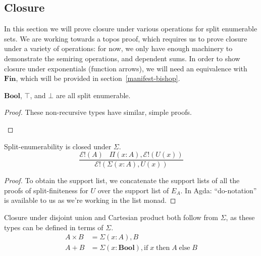 \subsection{Closure}
In this section we will prove closure under various operations for split
enumerable sets.
We are working towards a topos proof, which requires us to prove closure under
a variety of operations: for now, we only have enough machinery to demonstrate
the semiring operations, and dependent sums.
In order to show closure under exponentials (function arrows), we will need an
equivalence with \(\mathbf{Fin}\), which will be provided in
section~\ref{manifest-bishop}.
\begin{rm-lemma} \label{split-enum-bool-top-bot}
  \(\mathbf{Bool}\), \(\top\), and \(\bot\) are all split enumerable.
\end{rm-lemma}
\begin{proof}
  These non-recursive types have similar, simple proofs.
  \begin{multicols}{3}
  \end{multicols}
\end{proof}
\begin{rm-theorem} \label{split-enum-sigma}
  Split-enumerability is closed under \(\Sigma\).
  \begin{equation} \label{split-enum-sigma-clos-sig}
    \frac{
      \mathcal{E}!(A) \; \; \; \Pi (x : A) , \mathcal{E}!(U(x))
    }{
      \mathcal{E}!(\Sigma (x : A) , U(x))
    }
  \end{equation}
\end{rm-theorem}
\begin{proof}
  To obtain the support list, we concatenate the support lists of all the proofs
  of split-finiteness for \(U\) over the support list of \(E_A\).
  In Agda:
  ``do-notation'' is available to us as we're working in the list monad.
\end{proof}
Closure under disjoint union and Cartesian product both follow from \(\Sigma\),
as these types can be defined in terms of \(\Sigma\).
\begin{align}
  A \times B &= \Sigma {(x : A)} , B \\
  A + B &= \Sigma {(x : \mathbf{Bool})} , \text{if} \; x \; \text{then} \; A \; \text{else} \; B
\end{align}
